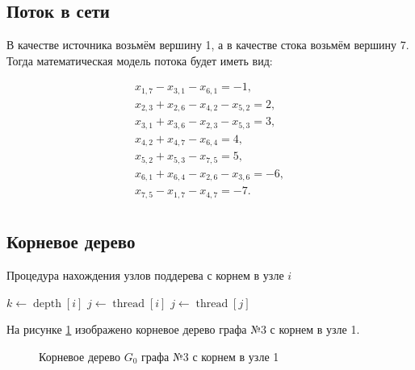 \documentclass[a4paper,14pt,usenames,dvipsnames]{extreport}
\begin{document}
\subsection*{Поток в сети}
В качестве источника возьмём вершину 1, а в качестве стока возьмём вершину 7. Тогда математическая модель потока будет иметь вид:

\begin{gather*}
x_{1,7} - x_{3,1} - x_{6,1} = -1,\\
x_{2,3} + x_{2,6} - x_{4,2} - x_{5,2}= 2,\\
x_{3,1} + x_{3,6} - x_{2,3} - x_{5,3} = 3, \\
x_{4,2} + x_{4,7} - x_{6,4} = 4,\\
x_{5,2} + x_{5,3} - x_{7,5} = 5,\\
x_{6,1} + x_{6,4} - x_{2,6} - x_{3,6} = -6, \\
x_{7,5} - x_{1,7} - x_{4,7} = -7.\\
\end{gather*}

\subsection*{Корневое дерево}

\begin{algorithm} [H]
\caption{Процедура нахождения узлов поддерева с корнем в узле $i$}\label{alg:Example}
\begin{algorithmic}
\State $k \gets \operatorname{depth}[i]$
\State $j \gets \operatorname{thread}[i]$
    \State $j \gets \operatorname{thread}[j]$
\EndWhile
\end{algorithmic}
\end{algorithm}

На рисунке \ref{pic:3typekornder} изображено корневое дерево графа №3 с корнем в узле 1.

\begin{figure}[H]
\centering
{}
\caption{Корневое дерево $G_0$ графа №3 с корнем в узле 1}\label{pic:3typekornder}
\end{figure}
\end{document}
